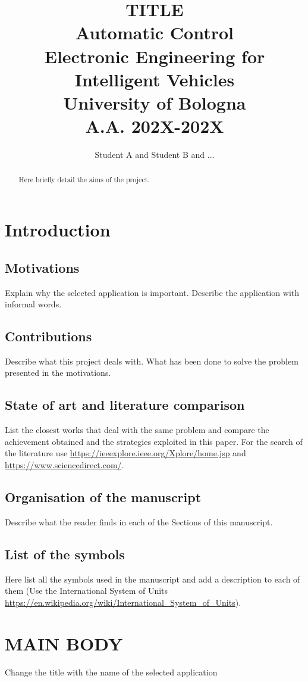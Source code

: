 \documentclass[]{report}
\title{{\huge  TITLE} \\
{\small Automatic Control\\
Electronic Engineering for Intelligent Vehicles\\
University of Bologna\\
A.A. 202X-202X}}
\author{Student A and Student B and ...}
\begin{document}
\maketitle

\begin{abstract}
	Here briefly detail  the aims of the project.
\end{abstract}

\chapter{Introduction}
\section{Motivations}
Explain why the selected application is important. Describe the application with informal words.

\section{Contributions}
Describe what this project deals with. What has been done to solve the problem presented in the motivations.

\section{State of art and literature comparison}
List the closest works that deal with the same problem and compare the achievement obtained and the strategies exploited in this paper. For the search of the literature use \url{https://ieeexplore.ieee.org/Xplore/home.jsp} and \url{https://www.sciencedirect.com/}.

\section{Organisation of the manuscript}
Describe what the reader finds in each of the Sections of this manuscript.

\section{List of the symbols}
Here list all the symbols used in the manuscript and add a description to each of them (Use the International System of Units \url{https://en.wikipedia.org/wiki/International_System_of_Units}).

\chapter{MAIN BODY}
Change the title with the name of the selected application
\end{document}
